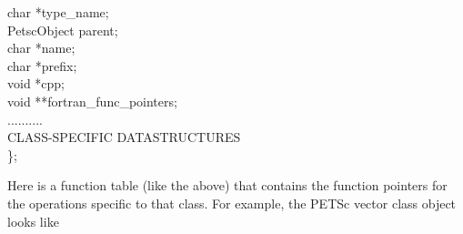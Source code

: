 \documentclass[twoside,12pt]{../sty/report_petsc}
\begin{document}
\begin{tabbing}
  char             *type\_name;                              \\
  PetscObject      parent;                                  \\
  char             *name;                                    \\
  char             *prefix;                                 \\
  void             *cpp;\\
  void             **fortran\_func\_pointers;       \\
  ..........\\
  CLASS-SPECIFIC DATASTRUCTURES\\
\}; 
\end{tabbing}
Here  is a function table (like the  above) that 
contains the function pointers for the operations specific to that class.
For example, the PETSc vector class object looks like
\end{document}
